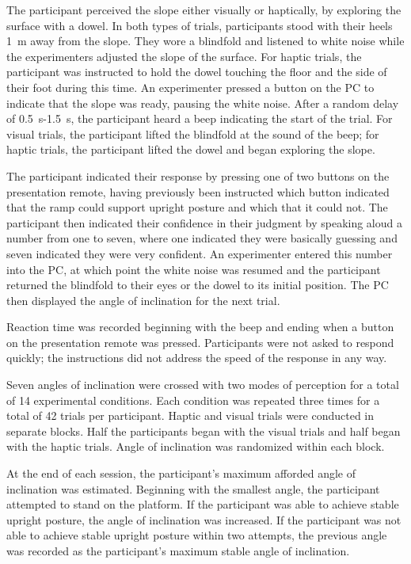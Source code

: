 The participant perceived the slope either visually or haptically, by exploring the surface with a dowel. In both types of trials, participants stood with their heels 1~m away from the slope. They wore a blindfold and listened to white noise while the experimenters adjusted the slope of the surface. For haptic trials, the participant was instructed to hold the dowel touching the floor and the side of their foot during this time. An experimenter pressed a button on the PC to indicate that the slope was ready, pausing the white noise. After a random delay of 0.5~s-1.5~s, the participant heard a beep indicating the start of the trial. For visual trials, the participant lifted the blindfold at the sound of the beep; for haptic trials, the participant lifted the dowel and began exploring the slope.

The participant indicated their response by pressing one of two buttons on the presentation remote, having previously been instructed which button indicated that the ramp could support upright posture and which that it could not. The participant then indicated their confidence in their judgment by speaking aloud a number from one to seven, where one indicated they were basically guessing and seven indicated they were very confident. An experimenter entered this number into the PC, at which point the white noise was resumed and the participant returned the blindfold to their eyes or the dowel to its initial position. The PC then displayed the angle of inclination for the next trial.

Reaction time was recorded beginning with the beep and ending when a button on the presentation remote was pressed. Participants were not asked to respond quickly; the instructions did not address the speed of the response in any way.

Seven angles of inclination were crossed with two modes of perception for a total of 14 experimental conditions. Each condition was repeated three times for a total of 42 trials per participant. Haptic and visual trials were conducted in separate blocks. Half the participants began with the visual trials and half began with the haptic trials. Angle of inclination was randomized within each block.

At the end of each session, the participant's maximum afforded angle of inclination was estimated. Beginning with the smallest angle, the participant attempted to stand on the platform. If the participant was able to achieve stable upright posture, the angle of inclination was increased. If the participant was not able to achieve stable upright posture within two attempts, the previous angle was recorded as the participant's maximum stable angle of inclination.